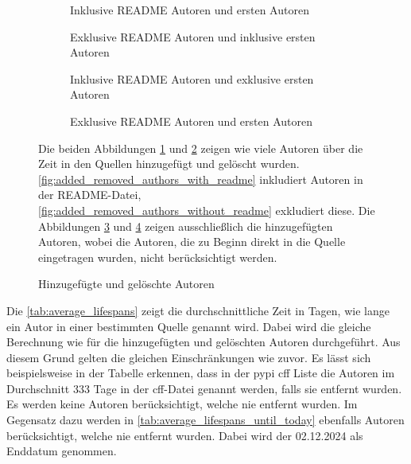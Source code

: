 \begin{figure}
    \begin{subfigure}{.5\textwidth}
        \centering
        
        \caption{Inklusive README Autoren und ersten Autoren}
        \label{fig:added_removed_authors_with_readme}
    \end{subfigure}%
    \begin{subfigure}{.5\textwidth}
        \centering
        
        \caption{Exklusive README Autoren und inklusive ersten Autoren}
        \label{fig:added_removed_authors_without_readme}
    \end{subfigure}
    \begin{subfigure}{.5\textwidth}
        \centering
        
        \caption{Inklusive README Autoren und exklusive ersten Autoren}
        \label{fig:added_authors_without_first_timestamp}
    \end{subfigure}%
    \begin{subfigure}{.5\textwidth}
        \centering
        
        \caption{Exklusive README Autoren und ersten Autoren}
        \label{fig:added_authors_without_readme_without_first_timestamp}
    \end{subfigure}
    \caption{Hinzugefügte und gelöschte Autoren}
    \label{fig:added_removed_authors}
    \small
    Die beiden Abbildungen \ref{fig:added_removed_authors_with_readme} und \ref{fig:added_removed_authors_without_readme} zeigen wie viele Autoren über die Zeit in den Quellen hinzugefügt und gelöscht wurden. \autoref{fig:added_removed_authors_with_readme} inkludiert Autoren in der README-Datei, \autoref{fig:added_removed_authors_without_readme} exkludiert diese. Die Abbildungen \ref{fig:added_authors_without_first_timestamp} und \ref{fig:added_authors_without_readme_without_first_timestamp} zeigen ausschließlich die hinzugefügten Autoren, wobei die Autoren, die zu Beginn direkt in die Quelle eingetragen wurden, nicht berücksichtigt werden.
\end{figure}

Die \autoref{tab:average_lifespans} zeigt die durchschnittliche Zeit in Tagen, wie lange ein Autor in einer bestimmten Quelle genannt wird.
Dabei wird die gleiche Berechnung wie für die hinzugefügten und gelöschten Autoren durchgeführt.
Aus diesem Grund gelten die gleichen Einschränkungen wie zuvor.
Es lässt sich beispielsweise in der Tabelle erkennen, dass in der \gls{pypi} \gls{cff} Liste die Autoren im Durchschnitt 333 Tage in der \gls{cff}-Datei genannt werden, falls sie entfernt wurden.
Es werden keine Autoren berücksichtigt, welche nie entfernt wurden.
Im Gegensatz dazu werden in \autoref{tab:average_lifespans_until_today} ebenfalls Autoren berücksichtigt, welche nie entfernt wurden. Dabei wird der 02.12.2024 als Enddatum genommen.

